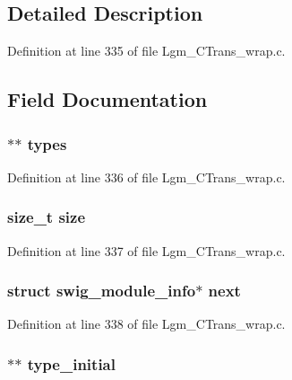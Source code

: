 \subsection{Detailed Description}


Definition at line 335 of file Lgm\_\-CTrans\_\-wrap.c.

\subsection{Field Documentation}
\hypertarget{structswig__module__info_b3f7a3650d62b94bd66b389d74eec755}{
\subsubsection[{types}]{$\ast$$\ast$ {\bf types}}}
\label{structswig__module__info_b3f7a3650d62b94bd66b389d74eec755}




Definition at line 336 of file Lgm\_\-CTrans\_\-wrap.c.\hypertarget{structswig__module__info_854352f53b148adc24983a58a1866d66}{
\subsubsection[{size}]{\setlength{\rightskip}{0pt plus 5cm}size\_\-t {\bf size}}}
\label{structswig__module__info_854352f53b148adc24983a58a1866d66}




Definition at line 337 of file Lgm\_\-CTrans\_\-wrap.c.\hypertarget{structswig__module__info_f0954fbff8a3ad66e8e856a4f544a3d9}{
\subsubsection[{next}]{\setlength{\rightskip}{0pt plus 5cm}struct {\bf swig\_\-module\_\-info}$\ast$ {\bf next}}}
\label{structswig__module__info_f0954fbff8a3ad66e8e856a4f544a3d9}




Definition at line 338 of file Lgm\_\-CTrans\_\-wrap.c.\hypertarget{structswig__module__info_54e7d318722d57d376b4d394d254228f}{
\subsubsection[{type\_\-initial}]{$\ast$$\ast$ {\bf type\_\-initial}}}
\label{structswig__module__info_54e7d318722d57d376b4d394d254228f}




